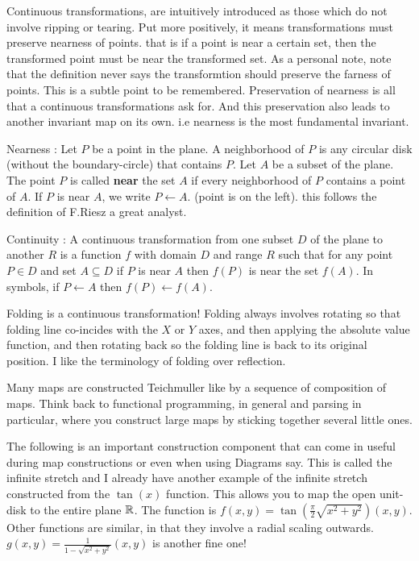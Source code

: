 \newchunk Continuous transformations, are intuitively introduced as those which do not involve ripping or tearing. Put more
positively, it means transformations must preserve nearness of points. that is if a point is near a certain set, then the
transformed point must be near the transformed set. As a personal note, note that the definition never says the transformtion
should preserve the farness of points. This is a subtle point to be remembered. Preservation of nearness is all that
a continuous transformations ask for. And this preservation also leads to another invariant map on its own. i.e nearness
is the most fundamental invariant.

\newchunk \Large Nearness \normalsize : Let $P$ be a point in the plane. A neighborhood of $P$ is any circular disk (without the boundary-circle) that
contains $P$. Let $A$ be a subset of the plane. The point $P$ is called \textbf{near} the set $A$ if every neighborhood of $P$
contains a point of $A$. If $P$ is near $A$, we write $P\leftarrow A$. (point is on the left). this follows the definition of F.Riesz
a great analyst.

\newchunk \Large Continuity \normalsize : A continuous transformation from one subset $D$ of the plane to another $R$ is a function $f$ with
domain $D$ and range $R$ such that for any point $P \in D$ and set $A \subseteq D$ if $P$ is near $A$ then $f(P)$ is near
the set $f(A)$. In symbols, if $P \leftarrow A$ then $f(P) \leftarrow f(A)$.  

\newchunk Folding is a continuous transformation! Folding always involves rotating so that folding line co-incides with the $X$ or $Y$
axes, and then applying the absolute value function, and then rotating back so the folding line is back to its original position.
I like the terminology of folding over reflection. 

\newchunk Many maps are constructed Teichmuller like by a sequence of composition of maps. Think back to functional programming, in general
and parsing in particular, where you construct large maps by sticking together several little ones. 

\newchunk The following is an important construction component that can come in useful during map constructions or even when using
Diagrams say. This is called the infinite stretch and I already have another example of the infinite stretch constructed from the
$\tan(x)$ function. This allows you to map the open unit-disk to the entire plane $\mathbb{R}$.
The function is $f(x,y) = \tan (\frac{\pi}{2}\sqrt{x^2+y^2}) (x,y)$. Other functions are similar, in that they involve a radial scaling
outwards. $g(x,y) = \frac{1}{1-\sqrt{x^2+y^2}} (x,y)$ is another fine one!

